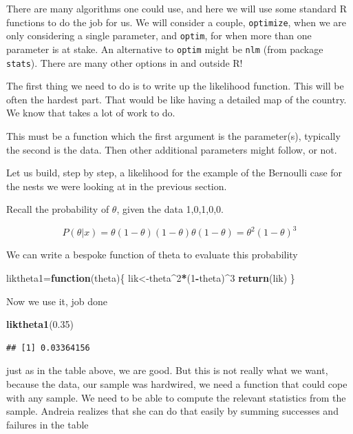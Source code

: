 \documentclass[
]{book}
\newenvironment{Shaded}{\begin{snugshade}}{\end{snugshade}}
\newcommand{\ControlFlowTok}[1]{\textcolor[rgb]{0.13,0.29,0.53}{\textbf{#1}}}
\newcommand{\DecValTok}[1]{\textcolor[rgb]{0.00,0.00,0.81}{#1}}
\newcommand{\FloatTok}[1]{\textcolor[rgb]{0.00,0.00,0.81}{#1}}
\newcommand{\KeywordTok}[1]{\textcolor[rgb]{0.13,0.29,0.53}{\textbf{#1}}}
\newcommand{\NormalTok}[1]{#1}
\newcommand{\OperatorTok}[1]{\textcolor[rgb]{0.81,0.36,0.00}{\textbf{#1}}}
\begin{document}
There are many algorithms one could use, and here we will use some standard R functions to do the job for us. We will consider a couple, \texttt{optimize}, when we are only considering a single parameter, and \texttt{optim}, for when more than one parameter is at stake. An alternative to \texttt{optim} might be \texttt{nlm} (from package \texttt{stats}). There are many other options in and outside R!

The first thing we need to do is to write up the likelihood function. This will be often the hardest part. That would be like having a detailed map of the country. We know that takes a lot of work to do.

This must be a function which the first argument is the parameter(s), typically the second is the data. Then other additional parameters might follow, or not.

Let us build, step by step, a likelihood for the example of the Bernoulli case for the nests we were looking at in the previous section.

Recall the probability of \(\theta\), given the data 1,0,1,0,0.

\[P(\theta|x)=\theta (1-\theta) (1-\theta) \theta (1-\theta)=\theta^2 (1-\theta)^3\]

We can write a bespoke function of theta to evaluate this probability

\begin{Shaded}
\begin{Highlighting}[]
\NormalTok{liktheta1=}\ControlFlowTok{function}\NormalTok{(theta)\{}
\NormalTok{  lik<-theta}\OperatorTok{^}\DecValTok{2}\OperatorTok{*}\NormalTok{(}\DecValTok{1}\OperatorTok{-}\NormalTok{theta)}\OperatorTok{^}\DecValTok{3}
  \KeywordTok{return}\NormalTok{(lik)}
\NormalTok{\}}
\end{Highlighting}
\end{Shaded}

Now we use it, job done

\begin{Shaded}
\begin{Highlighting}[]
\KeywordTok{liktheta1}\NormalTok{(}\FloatTok{0.35}\NormalTok{)}
\end{Highlighting}
\end{Shaded}

\begin{verbatim}
## [1] 0.03364156
\end{verbatim}

just as in the table above, we are good. But this is not really what we want, because the data, our sample was hardwired, we need a function that could cope with any sample. We need to be able to compute the relevant statistics from the sample. Andreia realizes that she can do that easily by summing successes and failures in the table
\end{document}
